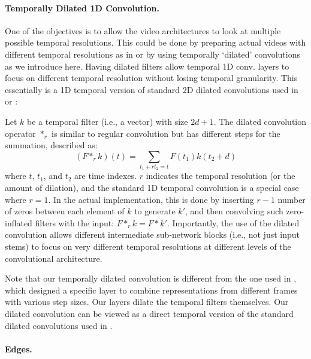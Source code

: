 \documentclass{article} \usepackage{iclr2020_conference,times}
\begin{document}
\vspace{-5pt}
\paragraph{Temporally Dilated 1D Convolution.}



One of the objectives is to allow the video architectures to look at multiple possible temporal resolutions. This could be done by preparing actual videos with different temporal resolutions as in \cite{feichtenhofer2018slowfast} or by using temporally `dilated’ convolutions as we introduce here. Having dilated filters allow temporal 1D conv. layers to focus on different temporal resolution without losing temporal granularity.  This essentially is a 1D temporal version of standard 2D dilated convolutions used in \cite{chen2018deeplab} or \cite{yu2016dilated}:

Let $k$ be a temporal filter (i.e., a vector) with size $2d + 1$. The dilated convolution operator $*_{r}$ is similar to regular convolution but has different steps for the summation, described as:
\begin{equation}
(F*_{r}k) (t) = \sum_{t_1 + r t_2=t} F(t_1) k(t_2 + d)
\end{equation}
where $t$, $t_1$, and $t_2$ are time indexes. $r$ indicates the temporal resolution (or the amount of dilation), and the standard 1D temporal convolution is a special case where $r=1$. In the actual implementation, this is done by inserting $r-1$ number of zeros between each element of $k$ to generate $k'$, and then convolving such zero-inflated filters with the input: $F*_{r}k = F*k'$. Importantly, the use of the dilated convolution allows different intermediate sub-network blocks (i.e., not just input stems) to focus on very different temporal resolutions at different levels of the convolutional architecture.




Note that our temporally dilated convolution is different from the one used in \cite{lea2017temporal}, which designed a specific layer to combine representations from different frames with various step sizes. Our layers dilate the temporal filters themselves. Our dilated convolution can be viewed as a direct temporal version of the standard dilated convolutions used in \cite{chen2018deeplab,yu2016dilated}.


\vspace{-5pt}
\paragraph{Edges.}
\end{document}
